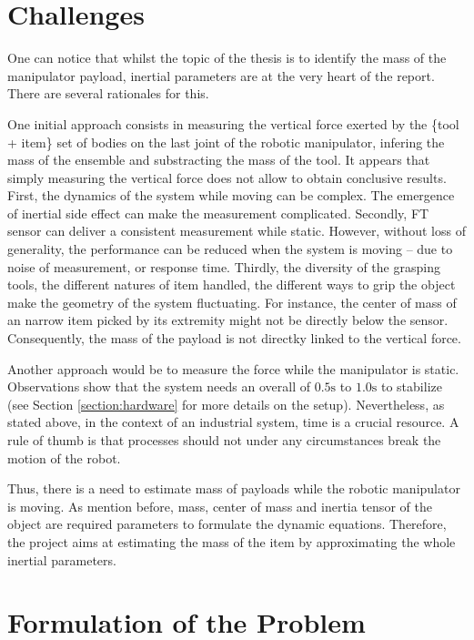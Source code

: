 \documentclass[/home/francois/latex/report/main.tex]{subfiles}
\begin{document}
\section{Challenges}

One can notice that whilst the topic of the thesis is to identify the mass of the manipulator payload, inertial parameters are at the very heart of the report. There are several rationales for this.

One initial approach consists in measuring the vertical force exerted by the \{tool + item\} set of bodies on the last joint of the robotic manipulator, infering the mass of the ensemble and substracting the mass of the tool. It appears that simply measuring the vertical force does not allow to obtain conclusive results. First, the dynamics of the system while moving can be complex. The emergence of inertial side effect can make the measurement complicated. Secondly, \ac{FT} sensor can deliver a consistent measurement while static. However, without loss of generality, the performance can be reduced when the system is moving – due to noise of measurement, or response time. Thirdly, the diversity of the grasping tools, the different natures of item handled, the different ways to grip the object make the geometry of the system fluctuating. For instance, the center of mass of an narrow item picked by its extremity might not be directly below the sensor. Consequently, the mass of the payload is not directky linked to the vertical force.

Another approach would be to measure the force while the manipulator is static. Observations show that the system needs an overall of $0.5 \si{\second}$ to $1.0 \si{\second}$ to stabilize (see Section \ref{section:hardware} for more details on the setup). Nevertheless, as stated above, in the context of an industrial system, time is a crucial resource. A rule of thumb is that processes should not under any circumstances break the motion of the robot.

Thus, there is a need to estimate mass of payloads while the robotic manipulator is moving. As mention before, mass, center of mass and inertia tensor of the object are required parameters to formulate the dynamic equations. Therefore, the project aims at estimating the mass of the item by approximating the whole inertial parameters.


\section{Formulation of the Problem}
\end{document}
